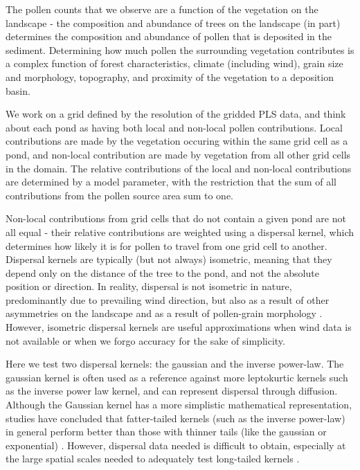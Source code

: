 \documentclass[12pt]{article}
\begin{document}
The pollen counts that we observe are a function of the vegetation on
the landscape - the composition and abundance of trees on the
landscape (in part) determines the composition and abundance of pollen
that is deposited in the sediment. Determining how much pollen the
surrounding vegetation contributes is a complex function of forest
characteristics, climate (including wind), grain size and morphology,
topography, and proximity of the vegetation to a deposition basin.

We work on a grid defined by the resolution of the gridded PLS data,
and think about each pond as having both local and non-local pollen
contributions. Local contributions are made by the vegetation occuring
within the same grid cell as a pond, and non-local contribution are
made by vegetation from all other grid cells in the domain. The
relative contributions of the local and non-local contributions are
determined by a model parameter, with the restriction that the sum of
all contributions from the pollen source area sum to one.

Non-local contributions from grid cells that do not contain a given
pond are not all equal - their relative contributions are weighted
using a dispersal kernel, which determines how likely it is for pollen
to travel from one grid cell to another. Dispersal kernels are
typically (but not always) isometric, meaning that they depend only on
the distance of the tree to the pond, and not the absolute position or
direction. In reality, dispersal is not isometric in nature,
predominantly due to prevailing wind direction, but also as a result
of other asymmetries on the landscape and as a result of pollen-grain
morphology \cite{XXX}. However, isometric dispersal kernels are useful
approximations when wind data is not available or when we forgo
accuracy for the sake of simplicity.

Here we test two dispersal kernels: the gaussian and the inverse
power-law. The gaussian kernel is often used as a reference against
more leptokurtic kernels such as the inverse power law kernel, and can
represent dispersal through diffusion. Although the Gaussian kernel
has a more simplistic mathematical representation, studies have
concluded that fatter-tailed kernels (such as the inverse power-law)
in general perform better than those with thinner tails (like the
gaussian or exponential) \cite{XXX}. However, dispersal data needed is
difficult to obtain, especially at the large spatial scales needed to
adequately test long-tailed kernels \cite{XXX}. 
\end{document}
